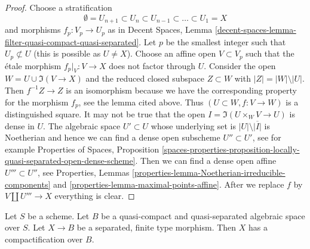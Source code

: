 \begin{proof}
Choose a stratification
$$
\emptyset = U_{n + 1} \subset
U_n \subset U_{n - 1} \subset \ldots \subset U_1 = X
$$
and morphisms $f_p : V_p \to U_p$ as in Decent Spaces, Lemma
\ref{decent-spaces-lemma-filter-quasi-compact-quasi-separated}.
Let $p$ be the smallest integer such that $U_p \not \subset U$
(this is possible as $U \not = X$). Choose an affine open $V \subset V_p$
such that the \'etale morphism $f_p|_V : V \to X$ does not factor through $U$.
Consider the open $W = U \cup \Im(V \to X)$ and the
reduced closed subspace $Z \subset W$ with $|Z| = |W| \setminus |U|$.
Then $f^{-1}Z \to Z$ is an isomorphism because we have the
corresponding property for the morphism $f_p$, see the lemma cited above.
Thus $(U \subset W, f : V \to W)$ is a distinguished square.
It may not be true that the open $I = \Im(U \times_W V \to U)$
is dense in $U$. The algebraic space $U' \subset U$ whose underlying
set is $|U| \setminus \overline{|I|}$ is Noetherian
and hence we can find a dense open subscheme $U'' \subset U'$, see
for example Properties of Spaces, Proposition
\ref{spaces-properties-proposition-locally-quasi-separated-open-dense-scheme}.
Then we can find a dense open affine $U''' \subset U''$, see
Properties, Lemmas \ref{properties-lemma-Noetherian-irreducible-components}
and \ref{properties-lemma-maximal-points-affine}.
After we replace $f$ by $V \amalg U''' \to X$ everything is clear.
\end{proof}

\begin{theorem}
\label{theorem-nagata}
\begin{reference}
\cite{CLO}
\end{reference}
Let $S$ be a scheme. Let $B$ be a quasi-compact and quasi-separated
algebraic space over $S$. Let $X \to B$ be a separated, finite type morphism.
Then $X$ has a compactification over $B$.
\end{theorem}

